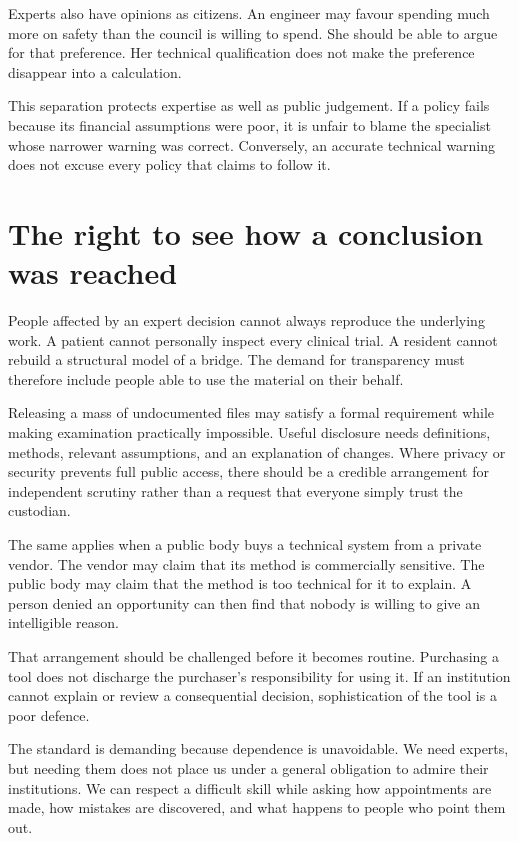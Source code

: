 \documentclass[12pt,a4paper]{book}
\begin{document}
Experts also have opinions as citizens. An engineer may favour spending much more on safety than the council is willing to spend. She should be able to argue for that preference. Her technical qualification does not make the preference disappear into a calculation.

This separation protects expertise as well as public judgement. If a policy fails because its financial assumptions were poor, it is unfair to blame the specialist whose narrower warning was correct. Conversely, an accurate technical warning does not excuse every policy that claims to follow it.

\section*{The right to see how a conclusion was reached}

People affected by an expert decision cannot always reproduce the underlying work. A patient cannot personally inspect every clinical trial. A resident cannot rebuild a structural model of a bridge. The demand for transparency must therefore include people able to use the material on their behalf.

Releasing a mass of undocumented files may satisfy a formal requirement while making examination practically impossible. Useful disclosure needs definitions, methods, relevant assumptions, and an explanation of changes. Where privacy or security prevents full public access, there should be a credible arrangement for independent scrutiny rather than a request that everyone simply trust the custodian.

The same applies when a public body buys a technical system from a private vendor. The vendor may claim that its method is commercially sensitive. The public body may claim that the method is too technical for it to explain. A person denied an opportunity can then find that nobody is willing to give an intelligible reason.

That arrangement should be challenged before it becomes routine. Purchasing a tool does not discharge the purchaser's responsibility for using it. If an institution cannot explain or review a consequential decision, sophistication of the tool is a poor defence.

The standard is demanding because dependence is unavoidable. We need experts, but needing them does not place us under a general obligation to admire their institutions. We can respect a difficult skill while asking how appointments are made, how mistakes are discovered, and what happens to people who point them out.
\end{document}
